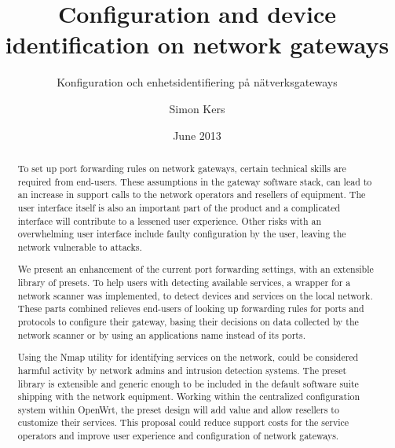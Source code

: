 \documentclass[a4paper,11pt,makeidx]{kth-bcs}
\date{June 2013}
\title{Configuration and device identification on network gateways}
\subtitle{Konfiguration och enhetsidentifiering på nätverksgateways}
\author{Simon Kers}
\newcommand\blankpage{%
    \null
    \thispagestyle{empty}%
    \addtocounter{page}{-1}%
    \newpage}
\begin{document}
\frontmatter
{}
\setcounter{page}{1}
\pagestyle{center}

\maketitle
\thispagestyle{center}
\begin{abstract}
To set up port forwarding rules on network gateways, certain technical skills are required from end-users.
These assumptions in the gateway software stack, can lead to an increase in support calls to the network operators and resellers of equipment.
The user interface itself is also an important part of the product and a complicated interface will contribute to a lessened user experience.
Other risks with an overwhelming user interface include faulty configuration by the user, leaving the network vulnerable to attacks.


We present an enhancement of the current port forwarding settings, with an extensible library of presets.
To help users with detecting available services, a wrapper for a network scanner was implemented, to detect devices and services on the local network.
These parts combined relieves end-users of looking up forwarding rules for ports and protocols to configure their gateway, basing their decisions on data collected by the network scanner or by using an applications name instead of its ports.

Using the Nmap utility for identifying services on the network, could be considered harmful activity by network admins and intrusion detection systems.
The preset library is extensible and generic enough to be included in the default software suite shipping with the network equipment.
Working within the centralized configuration system within OpenWrt, the preset design will add value and allow resellers to customize their services.
This proposal could reduce support costs for the service operators and improve user experience and configuration of network gateways.

\end{abstract}
\newpage
\blankpage
\end{document}
